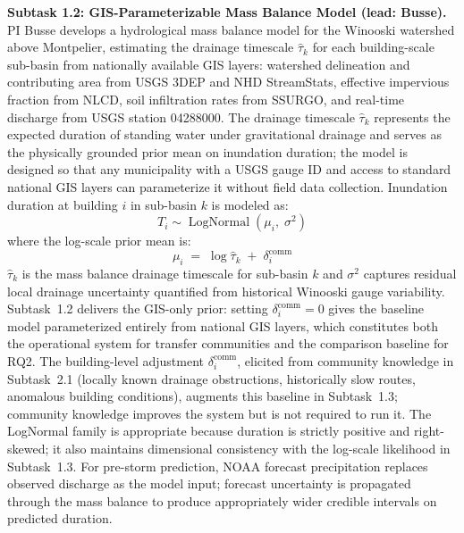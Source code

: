 \documentclass[11pt]{article}
\begin{document}
\textbf{Subtask 1.2: GIS-Parameterizable Mass Balance Model (lead: Busse).}
PI Busse develops a hydrological mass balance model for the Winooski watershed above
Montpelier, estimating the drainage timescale $\hat{\tau}_k$ for each building-scale
sub-basin from nationally available GIS layers: watershed delineation and contributing
area from USGS 3DEP and NHD StreamStats, effective impervious fraction from NLCD,
soil infiltration rates from SSURGO, and real-time discharge from USGS station
04288000.
The drainage timescale $\hat{\tau}_k$ represents the expected duration of standing
water under gravitational drainage and serves as the physically grounded prior mean
on inundation duration; the model is designed so that any municipality with a USGS
gauge ID and access to standard national GIS layers can parameterize it without
field data collection.
Inundation duration at building $i$ in sub-basin $k$ is modeled as:
\begin{equation}
  T_i \sim \operatorname{LogNormal}(\mu_i,\; \sigma^2)
\end{equation}
where the log-scale prior mean is:
\begin{equation}
  \mu_i \;=\; \log \hat{\tau}_k \;+\; \delta_i^{\mathrm{comm}}
\end{equation}
$\hat{\tau}_k$ is the mass balance drainage timescale for sub-basin $k$ and
$\sigma^2$ captures residual local drainage uncertainty quantified from historical
Winooski gauge variability.
Subtask~1.2 delivers the GIS-only prior: setting $\delta_i^{\mathrm{comm}} = 0$
gives the baseline model parameterized entirely from national GIS layers, which
constitutes both the operational system for transfer communities and the comparison
baseline for RQ2.
The building-level adjustment $\delta_i^{\mathrm{comm}}$, elicited from community
knowledge in Subtask~2.1 (locally known drainage obstructions, historically slow
routes, anomalous building conditions), augments this baseline in Subtask~1.3;
community knowledge improves the system but is not required to run it.
The LogNormal family is appropriate because duration is strictly positive and
right-skewed; it also maintains dimensional consistency with the log-scale
likelihood in Subtask~1.3.
For pre-storm prediction, NOAA forecast precipitation replaces observed discharge
as the model input; forecast uncertainty is propagated through the mass balance to
produce appropriately wider credible intervals on predicted duration.
\end{document}
